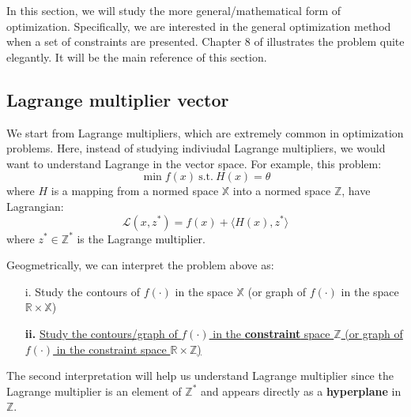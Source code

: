 In this section, we will study the more general/mathematical form of optimization. Specifically, we are interested in the general optimization method when a set of constraints are presented.
Chapter 8 of \citet{luenberger1997optimization} illustrates the problem quite elegantly. It will be the main reference of this section.

\subsection{Lagrange multiplier vector}
We start from Lagrange multipliers, which are extremely common in optimization problems. Here, instead of studying indiviudal Lagrange multipliers, we would want to understand Lagrange in the vector space. For example, this problem:
$$\min f(x)\ \text{s.t.}\ H(x)=\theta$$
where $H$ is a mapping from a normed space $\mathbb{X}$ into a normed space $\mathbb{Z}$, have Lagrangian:
$$\mathcal{L}(x,z^*)=f(x)+\langle H(x),z^*\rangle$$
where $z^*\in \mathbb{Z}^*$ is the Lagrange multiplier. 

Geogmetrically, we can interpret the problem above as:
\begin{enumerate}
    \item[i.] Study the contours of $f(\cdot)$ in the space $\mathbb{X}$ (or graph of $f(\cdot)$ in the space $\mathbb{R}\times \mathbb{X}$)
    \item[\textbf{ii.}] \underline{Study the contours/graph of $f(\cdot)$ in the \textbf{constraint} space $\mathbb{Z}$ (or graph of $f(\cdot)$ in the constraint space $\mathbb{R}\times \mathbb{Z}$)}
\end{enumerate}

The second interpretation will help us understand Lagrange multiplier since the Lagrange multiplier is an element of $\mathbb{Z}^*$ and appears directly as a \textbf{hyperplane} in $\mathbb{Z}$.
